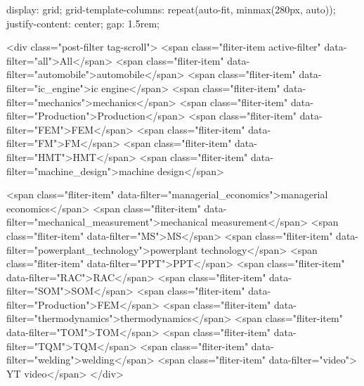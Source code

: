     display: grid;
    grid-template-columns: repeat(auto-fit, minmax(280px, auto));
    justify-content: center;
    gap: 1.5rem;



    <div class="post-filter tag-scroll">
            <span class="fliter-item active-filter" data-filter="all">All</span>
            <span class="fliter-item" data-filter="automobile">automobile</span>
            <span class="fliter-item" data-filter="ic_engine">ic engine</span>
            <span class="fliter-item" data-filter="mechanics">mechanics</span>
            <span class="fliter-item" data-filter="Production">Production</span>
            <span class="fliter-item" data-filter="FEM">FEM</span>
            <span class="fliter-item" data-filter="FM">FM</span>
            <span class="fliter-item" data-filter="HMT">HMT</span>
            <span class="fliter-item" data-filter="machine_design">machine design</span>
            
            <span class="fliter-item" data-filter="managerial_economics">managerial economics</span>
            <span class="fliter-item" data-filter="mechanical_measurement">mechanical measurement</span>
            <span class="fliter-item" data-filter="MS">MS</span>
            <span class="fliter-item" data-filter="powerplant_technology">powerplant technology</span>
            <span class="fliter-item" data-filter="PPT">PPT</span>
            <span class="fliter-item" data-filter="RAC">RAC</span>
            <span class="fliter-item" data-filter="SOM">SOM</span>
            <span class="fliter-item" data-filter="Production">FEM</span>
            <span class="fliter-item" data-filter="thermodynamics">thermodynamics</span>
            <span class="fliter-item" data-filter="TOM">TOM</span>
            <span class="fliter-item" data-filter="TQM">TQM</span>
            <span class="fliter-item" data-filter="welding">welding</span>
            <span class="fliter-item" data-filter="video"> YT video</span>
        </div>